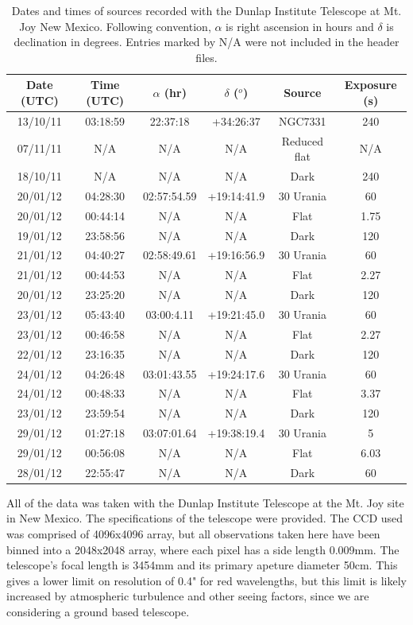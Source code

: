 \documentclass[a4paper,12pt]{article}
\begin{document}
\begin{table}[!htbp]
  \centering
  \begin{tabular}{c||c||c||c||c||c}
   Date (UTC) & Time (UTC) & $\alpha$ (hr) & $\delta$ ($^o$) & Source & Exposure (s)\\
   \hline
   13/10/11 & 03:18:59 & 22:37:18 & +34:26:37 & NGC7331 & 240\\
   07/11/11 & N/A & N/A & N/A & Reduced flat & N/A \\
   18/10/11 & N/A & N/A & N/A & Dark & 240\\
   \hline
   20/01/12 & 04:28:30 & 02:57:54.59 & +19:14:41.9 & 30 Urania & 60\\
   20/01/12 & 00:44:14 & N/A & N/A & Flat & 1.75\\
   19/01/12 & 23:58:56 & N/A & N/A & Dark & 120\\
   \hline
   21/01/12 & 04:40:27 & 02:58:49.61 & +19:16:56.9 & 30 Urania & 60\\
   21/01/12 & 00:44:53 & N/A & N/A & Flat & 2.27\\
   20/01/12 & 23:25:20 & N/A & N/A & Dark & 120\\
   \hline
   23/01/12 & 05:43:40 & 03:00:4.11 & +19:21:45.0 & 30 Urania & 60\\
   23/01/12 & 00:46:58 & N/A & N/A & Flat & 2.27\\
   22/01/12 & 23:16:35 & N/A & N/A & Dark & 120\\
   \hline
   24/01/12 & 04:26:48 & 03:01:43.55 & +19:24:17.6 & 30 Urania & 60\\
   24/01/12 & 00:48:33 & N/A & N/A & Flat & 3.37\\
   23/01/12 & 23:59:54 & N/A & N/A & Dark & 120\\
   \hline
   29/01/12 & 01:27:18 & 03:07:01.64 & +19:38:19.4 & 30 Urania & 5\\
   29/01/12 & 00:56:08 & N/A & N/A & Flat & 6.03\\
   28/01/12 & 22:55:47 & N/A & N/A & Dark & 60\\
   \end{tabular}
    \caption{Dates and times of sources recorded with the Dunlap Institute Telescope at Mt. Joy New Mexico. Following convention, $\alpha$ is right ascension in hours and $\delta$ is declination in degrees. Entries marked by N/A were not included in the header files.}
    \label{tab:datatable}
\end{table}

All of the data was taken with the Dunlap Institute Telescope at the Mt. Joy site in New Mexico. The specifications of the telescope were provided. The CCD used was comprised of 4096x4096 array, but all observations taken here have been binned into a 2048x2048 array, where each pixel has a side length 0.009mm. The telescope's focal length is 3454mm and its primary apeture diameter 50cm. This gives a lower limit on resolution of 0.4" for red wavelengths, but this limit is likely increased by atmospheric turbulence and other seeing factors, since we are considering a ground based telescope.
\end{document}
